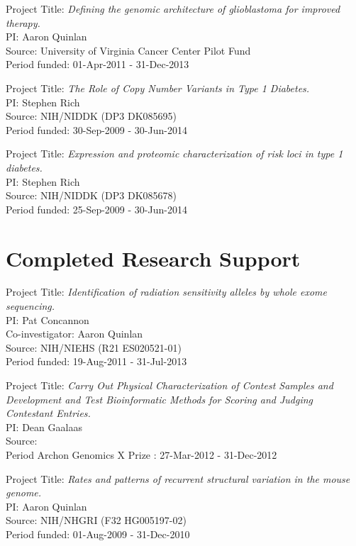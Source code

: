 \documentclass[margin,line]{cv}
\begin{document}
\begin{resume}
    \vspace{-2mm}
    Project Title: \textit{Defining the genomic architecture of glioblastoma for improved therapy.} \\
    PI: Aaron Quinlan \\
    Source: University of Virginia Cancer Center Pilot Fund\\
    Period funded: 01-Apr-2011 - 31-Dec-2013

    \vspace{-2mm}
    Project Title: \textit{The Role of Copy Number Variants in Type 1 Diabetes.} \\
    PI: Stephen Rich \\
    Source: NIH/NIDDK (DP3 DK085695)\\
    Period funded: 30-Sep-2009 - 30-Jun-2014

    \vspace{-2mm}
    Project Title: \textit{Expression and proteomic characterization of risk loci in type 1 diabetes.} \\
    PI: Stephen Rich \\
    Source: NIH/NIDDK (DP3 DK085678)\\
    Period funded: 25-Sep-2009 - 30-Jun-2014


    \section{\mysidestyle Completed Research Support}

    Project Title: \textit{Identification of radiation sensitivity alleles by whole exome sequencing.} \\
    PI: Pat Concannon \\
    Co-investigator: Aaron Quinlan \\
    Source: NIH/NIEHS (R21 ES020521-01) \\
    Period funded: 19-Aug-2011 - 31-Jul-2013

    \vspace{-2mm}
    Project Title: \textit{Carry Out Physical Characterization of Contest Samples and Development and Test Bioinformatic Methods for Scoring and Judging Contestant Entries.}\\
    PI: Dean Gaalaas\\
    Source: \\
    Period Archon Genomics X Prize : 27-Mar-2012 - 31-Dec-2012

    \vspace{-2mm}
    Project Title: \textit{Rates and patterns of recurrent structural variation in the mouse genome.}\\
    PI: Aaron Quinlan\\
    Source: NIH/NHGRI (F32 HG005197-02)\\
    Period funded: 01-Aug-2009 - 31-Dec-2010


\end{resume}
\end{document}
